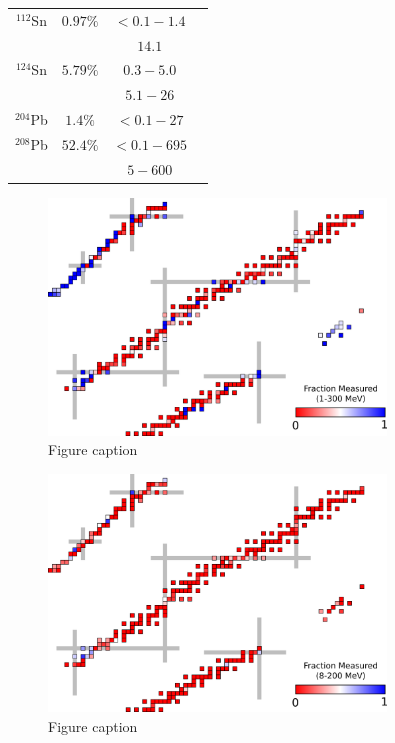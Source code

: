 \begin{table}[ht]
\begin{center}
\begin{tabular}{ c c c c }
            $^{112}$Sn & $0.97\%$ & $<0.1-1.4$ & \cite{Timokhov1989}\\
            & & $14.1$ & \cite{Dukarevich1967}\\

            $^{124}$Sn & $5.79\%$ & $0.3-5.0$ & \cite{Harper1982}\\
            & & $5.1-26$ & \cite{Rapaport1980}\\

            $^{204}$Pb & $1.4\%$ & $<0.1-27$ & \cite{Carlton2003}\\

            $^{208}$Pb & $52.4\%$ & $<0.1 - 695$ & \cite{Harvey1999}\\
            & & $5-600$ & \cite{Finlay1993}\\

            \hline
        \end{tabular}
    \end{center}
\end{table}

\begin{figure}
    \includegraphics[width=0.8\textwidth]{figures/TCSChart.png}
    \caption{Figure caption}
    \label{TCSChart}
\end{figure}

\begin{figure}
    \includegraphics[width=0.8\textwidth]{figures/RCSChart.png}
    \caption{Figure caption}
    \label{RCSChart}
\end{figure}

